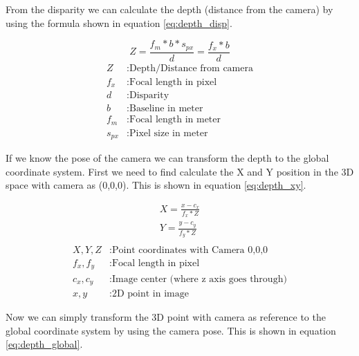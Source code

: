 \documentclass[11pt,a4paper,titlepage,oneside]{report}
\begin{document}
From the disparity we can calculate the depth (distance from the camera) by using the formula shown in equation \ref{eq:depth_disp}.

\begin{equation}\label{eq:depth_disp}
  Z=\frac{f_m*b*s_{px}}{d}=\frac{f_x*b}{d}
\end{equation}
\begin{align*}
  Z        &: \text{Depth/Distance from camera}\\
  f_x      &: \text{Focal length in pixel}\\
  d        &: \text{Disparity}\\
  b        &: \text{Baseline in meter}\\
  f_m      &: \text{Focal length in meter}\\
  s_{px}  &: \text{Pixel size in meter}
\end{align*}

If we know the pose of the camera we can transform the depth to the global coordinate system. First we need to find calculate the X and Y position in the 3D space with camera as (0,0,0). This is shown in equation \ref{eq:depth_xy}.

\begin{equation}\label{eq:depth_xy}
  \begin{gathered}
    X = \frac{x-c_x}{f_x*Z}\\
    Y = \frac{y-c_y}{f_y*Z}\\
  \end{gathered}
\end{equation}
\begin{align*}
  X,Y,Z    &: \text{Point coordinates with Camera 0,0,0}\\
  f_x,f_y  &: \text{Focal length in pixel}\\
  c_x,c_y  &: \text{Image center (where z axis goes through)}\\
  x,y      &: \text{2D point in image}
\end{align*}

Now we can simply transform the 3D point with camera as reference to the global coordinate system by using the camera pose. This is shown in equation \ref{eq:depth_global}.
\end{document}
